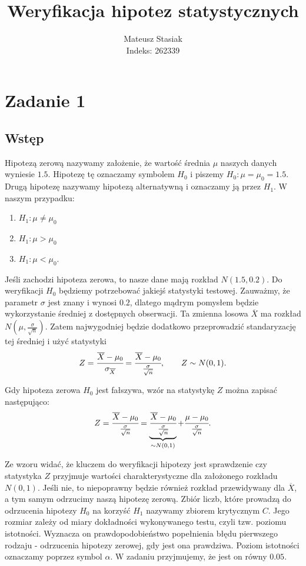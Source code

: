 \documentclass[12pt]{mwart}
\author{Mateusz Stasiak \\ Indeks: 262339}
\title{Weryfikacja hipotez statystycznych}
\begin{document}
	\maketitle
	
	\section{Zadanie 1}
	\subsection{Wstęp}
	\noindent Hipotezą zerową nazywamy założenie, że wartość średnia $\mu$ naszych danych wyniesie $1.5$. Hipotezę tę oznaczamy symbolem $H_0$ i piszemy $H_0 \colon \mu = \mu_0 = 1.5$. Drugą hipotezę nazywamy hipotezą alternatywną i oznaczamy ją przez $H_1$. W naszym przypadku:
	\begin{enumerate}[label=(\alph*)]
		\item $H_1 \colon \mu \neq \mu_0$
		\item $H_1 \colon \mu > \mu_0$
		\item $H_1 \colon \mu < \mu_0$. \\
	\end{enumerate} 
	
	\noindent Jeśli zachodzi hipoteza zerowa, to nasze dane mają rozkład $N(1.5,0.2)$. Do weryfikacji $H_0$ będziemy potrzebować jakiejś statystyki testowej. Zauważmy, że parametr $\sigma$ jest znany i wynosi $0.2$, dlatego mądrym pomysłem będzie wykorzystanie średniej z dostępnych obserwacji. Ta zmienna losowa $\overline{X}$ ma rozkład $N(\mu,\frac{\sigma}{\sqrt{n}})$. Zatem najwygodniej będzie dodatkowo przeprowadzić standaryzację tej średniej i użyć statystyki $$Z = \cfrac{\overline{X}-\mu_{0}}{\sigma_{\overline{X}}} = \cfrac{\overline{X}-\mu_{0}}{\frac{\sigma}{\sqrt{n}}}, \qquad Z \sim N(0,1).$$
	
	
	\noindent Gdy hipoteza zerowa $H_0$ jest fałszywa, wzór na statystykę $Z$ można zapisać następująco:
	$$ Z = \cfrac{\overline{X}-\mu_{0}}{\frac{\sigma}{\sqrt{n}}} = \underbrace{\cfrac{\overline{X}-\mu_{0}}{\frac{\sigma}{\sqrt{n}}}}_{\sim N(0,1)} + \cfrac{\mu-\mu_{0}}{\frac{\sigma}{\sqrt{n}}}.$$ 
	
	
	\noindent Ze wzoru widać, że kluczem do weryfikacji hipotezy jest sprawdzenie czy statystyka $Z$ przyjmuje wartości charakterystyczne dla założonego rozkładu $N(0,1)$. Jeśli nie, to niepoprawny będzie również rozkład przewidywany dla $\overline{X}$, a tym samym odrzucimy naszą hipotezę zerową. Zbiór liczb, które prowadzą do odrzucenia hipotezy $H_0$ na korzyść $H_1$ nazywamy zbiorem krytycznym $C$. Jego rozmiar zależy od miary dokładności wykonywanego testu, czyli tzw. poziomu istotności. Wyznacza on prawdopodobieństwo popełnienia błędu pierwszego rodzaju - odrzucenia hipotezy zerowej, gdy jest ona prawdziwa. Poziom istotności oznaczamy poprzez symbol $\alpha$. W zadaniu przyjmujemy, że jest on równy $0.05$.
	
\end{document}
